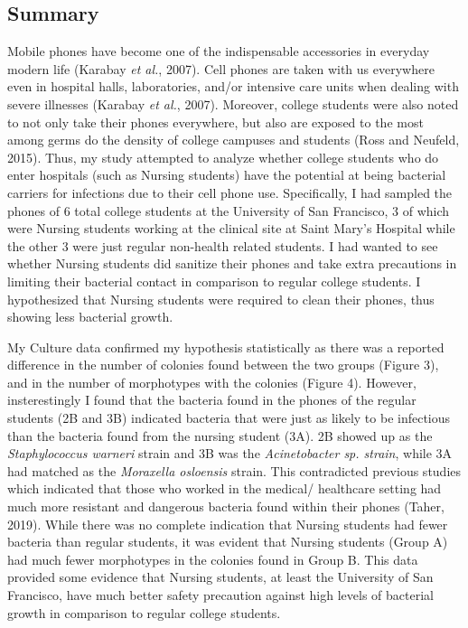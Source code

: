 \documentclass[]{article}
\begin{document}
\hypertarget{summary}{%
\subsection{Summary}\label{summary}}

Mobile phones have become one of the indispensable accessories in
everyday modern life (Karabay \emph{et al.}, 2007). Cell phones are
taken with us everywhere even in hospital halls, laboratories, and/or
intensive care units when dealing with severe illnesses (Karabay
\emph{et al.}, 2007). Moreover, college students were also noted to not
only take their phones everywhere, but also are exposed to the most
among germs do the density of college campuses and students (Ross and
Neufeld, 2015). Thus, my study attempted to analyze whether college
students who do enter hospitals (such as Nursing students) have the
potential at being bacterial carriers for infections due to their cell
phone use. Specifically, I had sampled the phones of 6 total college
students at the University of San Francisco, 3 of which were Nursing
students working at the clinical site at Saint Mary's Hospital while the
other 3 were just regular non-health related students. I had wanted to
see whether Nursing students did sanitize their phones and take extra
precautions in limiting their bacterial contact in comparison to regular
college students. I hypothesized that Nursing students were required to
clean their phones, thus showing less bacterial growth.

My Culture data confirmed my hypothesis statistically as there was a
reported difference in the number of colonies found between the two
groups (Figure 3), and in the number of morphotypes with the colonies
(Figure 4). However, insterestingly I found that the bacteria found in
the phones of the regular students (2B and 3B) indicated bacteria that
were just as likely to be infectious than the bacteria found from the
nursing student (3A). 2B showed up as the \emph{Staphylococcus warneri}
strain and 3B was the \emph{Acinetobacter sp. strain}, while 3A had
matched as the \emph{Moraxella osloensis} strain. This contradicted
previous studies which indicated that those who worked in the medical/
healthcare setting had much more resistant and dangerous bacteria found
within their phones (Taher, 2019). While there was no complete
indication that Nursing students had fewer bacteria than regular
students, it was evident that Nursing students (Group A) had much fewer
morphotypes in the colonies found in Group B. This data provided some
evidence that Nursing students, at least the University of San
Francisco, have much better safety precaution against high levels of
bacterial growth in comparison to regular college students.
\end{document}
